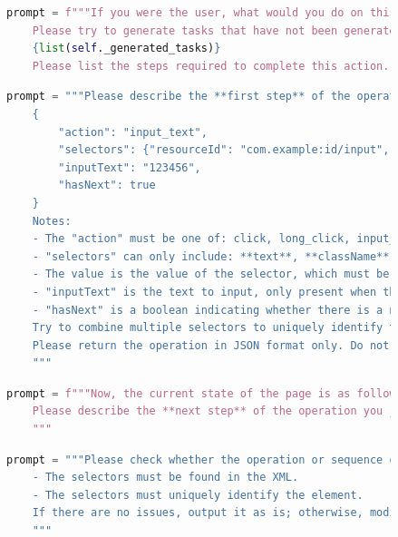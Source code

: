 \documentclass[twocolumn, 10pt]{article}
\begin{document}
\begin{figure}[t]
\centering
\begin{lstlisting}[language=python, caption=操作描述]
    prompt = f"""If you were the user, what would you do on this page? You can only describe one action. 
    Please try to generate tasks that have not been generated before. Below are the tasks that have already been generated:
    {list(self._generated_tasks)}
    Please list the steps required to complete this action. (This action will be named 'The Task')"""
\end{lstlisting}
\label{fig:action}
\end{figure}

\begin{figure}[t]
\centering
\begin{lstlisting}[language=python, caption=初始事件生成]
    prompt = """Please describe the **first step** of the operation you just performed in JSON format, as shown below:
    {
        "action": "input_text",
        "selectors": {"resourceId": "com.example:id/input", "text": "password"},
        "inputText": "123456",
        "hasNext": true
    }
    Notes:
    - The "action" must be one of: click, long_click, input_text, press_enter
    - "selectors" can only include: **text**, **className**, **description**, **resourceId**, and must be in camelCase. You can not use other selectors.
    - The value is the value of the selector, which must be found in the previous XML
    - "inputText" is the text to input, only present when the action is input_text
    - "hasNext" is a boolean indicating whether there is a next step. Set it to false if there is no next step
    Try to combine multiple selectors to uniquely identify the element.
    Please return the operation in JSON format only. Do not explain or use code blocks.
    """
\end{lstlisting}
\label{fig:iterative}
\end{figure}

\begin{figure}[t!]
\centering
\begin{lstlisting}[language=python, caption=后续事件生成]
    prompt = f"""Now, the current state of the page is as follows: {get_xml(self.device.u2)}
    Please describe the **next step** of the operation you just performed in JSON format, using the same format as above.
    """
\end{lstlisting}
\label{fig:next}
\end{figure}

\begin{figure}[t!]
\centering
\begin{lstlisting}[language=python, caption=操作检查]
    prompt = """Please check whether the operation or sequence of operations you just generated meets the requirements:
    - The selectors must be found in the XML.
    - The selectors must uniquely identify the element.
    If there are no issues, output it as is; otherwise, modify it accordingly.
    """
\end{lstlisting}
\label{fig:check}
\end{figure}



\end{document}
